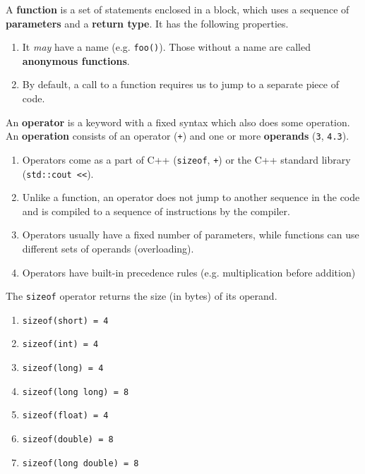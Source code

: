 \documentclass{article}
\begin{document}
    \begin{definition}[Function]
      A \textbf{function} is a set of statements enclosed in a block, which uses a sequence of \textbf{parameters} and a \textbf{return type}. It has the following properties. 
      \begin{enumerate}
        \item It \textit{may} have a name (e.g. \texttt{foo()}). Those without a name are called \textbf{anonymous functions}. 
        \item By default, a call to a function requires us to jump to a separate piece of code. 
      \end{enumerate}
    \end{definition}

    \begin{definition}[Operations]
      An \textbf{operator} is a keyword with a fixed syntax which also does some operation. An \textbf{operation} consists of an operator (\texttt{+}) and one or more \textbf{operands} (\texttt{3}, \texttt{4.3}).  
      \begin{enumerate}
        \item Operators come as a part of C++ (\texttt{sizeof}, \texttt{+}) or the C++ standard library (\texttt{std::cout <<}). 
        \item Unlike a function, an operator does not jump to another sequence in the code and is compiled to a sequence of instructions by the compiler. 
        \item Operators usually have a fixed number of parameters, while functions can use different sets of operands (overloading). 
        \item Operators have built-in precedence rules (e.g. multiplication before addition) 
      \end{enumerate}
    \end{definition}

    \begin{definition}
      The \texttt{sizeof} operator returns the size (in bytes) of its operand. 
      \begin{enumerate}
        \item \texttt{sizeof(short) = 4}
        \item \texttt{sizeof(int) = 4}
        \item \texttt{sizeof(long) = 4}
        \item \texttt{sizeof(long long) = 8}
        \item \texttt{sizeof(float) = 4}
        \item \texttt{sizeof(double) = 8}
        \item \texttt{sizeof(long double) = 8}
      \end{enumerate} 
    \end{definition}
\end{document}
